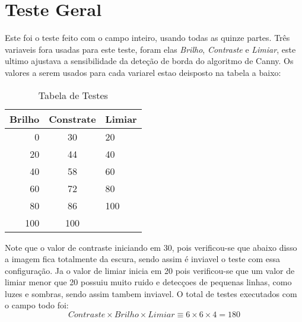 \section{Teste Geral}
Este foi o teste feito com o campo inteiro, usando todas as quinze partes. Três variaveis fora usadas para este teste, foram elas \textit{Brilho}, \textit{Contraste} e  \textit{Limiar}, este ultimo ajustava a sensibilidade da deteção de borda do algoritmo de Canny. Os valores a serem usados para cada variarel estao deisposto na tabela a baixo:

\begin{table}[h]
\centering
\caption{Tabela de Testes}
\begin{tabular}{r|c|l}
Brilho & Constrate & Limiar \\ %
\hline                               %
0 & 30 &  20\\
\hline 
20 &  44 &  40\\
\hline 
40 & 58 &  60 \\
\hline 
60 &  72 &  80\\
\hline 
80 & 86  & 100\\
\hline 
100 & 100  & \\
\hline  
\end{tabular}
\end{table}
Note que o valor de contraste iniciando em 30, pois verificou-se que abaixo disso a imagem fica totalmente da escura, sendo assim é inviavel o teste com essa configuração. Ja o valor de limiar inicia em 20 pois verificou-se que um valor de limiar menor que 20 possuiu muito ruido e detecçoes de pequenas linhas, como luzes e sombras, sendo assim tambem inviavel.
O total de testes executados com o campo todo foi:
\begin{displaymath}
 Contraste \times Brilho \times Limiar \equiv 6 \times 6 \times 4 = 180
\end{displaymath}
	
	
	
	
	

